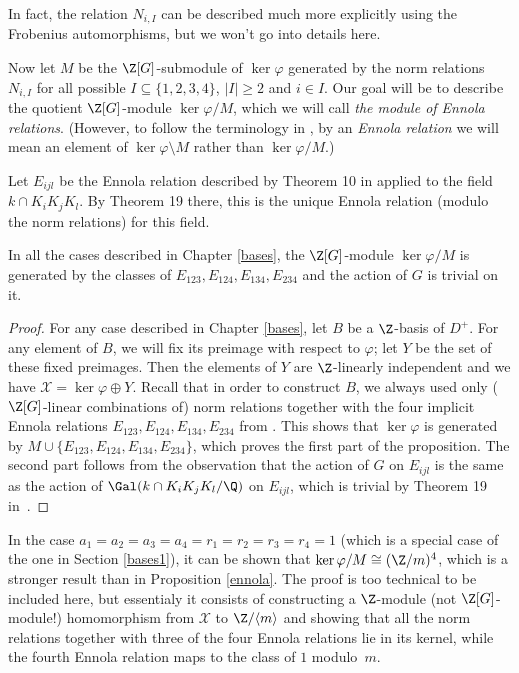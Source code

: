 \begin{rem}
In fact, the relation $N_{i,I}$ can be described much more explicitly using the Frobenius automorphisms, but we won't go into details here.
\end{rem}

Now let $M$ be the $\Z[G]$-submodule of $\ker \varphi$ generated by the norm relations $N_{i,I}$ for all possible $I \subseteq \{1,2,3,4\}$, $|I|\geq 2$ and $i\in I$. Our goal will be to describe the quotient $\Z[G]$-module $\ker\varphi/M$, which we will call \textit{the module of Ennola relations}. (However, to follow the terminology in \citep{Kucera2016}, by an \textit{Ennola relation} we will mean an element of $\ker\varphi\setminus M$ rather than $\ker\varphi/M$.)

Let $E_{ijl}$ be the Ennola relation described by Theorem 10 in \citep{Kucera2016} applied to the field $k\cap K_iK_jK_l$. By Theorem 19 there, this is the unique Ennola relation (modulo the norm relations) for this field.
\begin{prop}\label{ennola}
In all the cases described in Chapter \ref{bases}, the $\Z[G]$-module $\ker\varphi/M$ is generated by the classes of $E_{123},E_{124},E_{134},E_{234}$ and the action of $G$ is trivial on it.
\end{prop}

\begin{proof}
For any case described in Chapter \ref{bases}, let $B$ be a $\Z$-basis of $D^+$. For any element of $B$, we will fix its preimage with respect to $\varphi$; let $Y$ be the set of these fixed preimages. Then the elements of $Y$ are $\Z$-linearly independent and we have $\mathcal{X}=\ker\varphi\oplus Y$. Recall that in order to construct $B$, we always used only ($\Z[G]$-linear combinations of) norm relations together with the four implicit Ennola relations $E_{123},E_{124},E_{134},E_{234}$ from \citep{Kucera2016}. This shows that $\ker \varphi$ is generated by $M\cup\{E_{123},E_{124},E_{134},E_{234}\}$, which proves the first part of the proposition. The second part follows from the observation that the action of $G$ on $E_{ijl}$ is the same as the action of $\Gal(k\cap K_iK_jK_l/\Q)$ on $E_{ijl}$, which is trivial by Theorem 19 in~\citep{Kucera2016}.
\end{proof}

\begin{rem}
In the case $a_1=a_2=a_3=a_4=r_1=r_2=r_3=r_4=1$ (which is a special case of the one in Section \ref{bases1}), it can be shown that $\ker \varphi/M \cong (\Z/m)^4$, which is a stronger result than in Proposition \ref{ennola}. The proof is too technical to be included here, but essentialy it consists of constructing a $\Z$-module (not $\Z[G]$-module!) homomorphism from $\mathcal{X}$ to $\Z/\langle m\rangle$ and showing that all the norm relations together with three of the four Ennola relations lie in its kernel, while the fourth Ennola relation maps to the class of $1$ modulo~$m$.
\end{rem}

